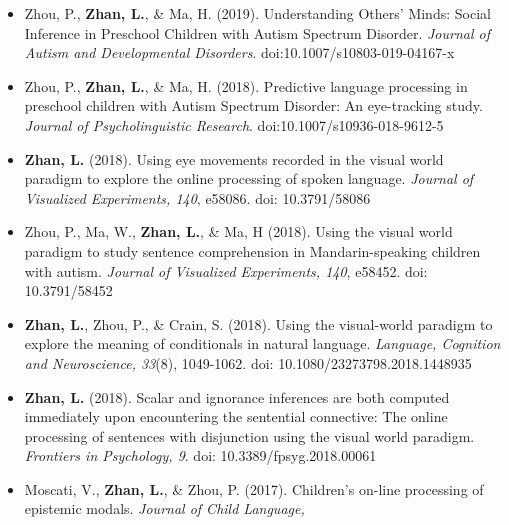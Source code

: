 \documentclass[12pt,]{article}
\begin{document}
\begin{itemize}
\item
  Zhou, P., \textbf{Zhan, L.}, \& Ma, H. (2019). Understanding Others'
  Minds: Social Inference in Preschool Children with Autism Spectrum
  Disorder. \emph{Journal of Autism and Developmental Disorders}.
  doi:10.1007/s10803-019-04167-x
  \href{https://publications.likan.info/Periodicals/JAutismDevDisord2019.pdf}{
  \faFilePdf[regular] }
\item
  Zhou, P., \textbf{Zhan, L.}, \& Ma, H. (2018). Predictive language
  processing in preschool children with Autism Spectrum Disorder: An
  eye-tracking study. \emph{Journal of Psycholinguistic Research}.
  doi:10.1007/s10936-018-9612-5
  \href{https://publications.likan.info/Periodicals/JPsycholinguistRes2018.pdf}{
  \faFilePdf[regular] }
\item
  \textbf{Zhan, L.} (2018). Using eye movements recorded in the visual
  world paradigm to explore the online processing of spoken language.
  \emph{Journal of Visualized Experiments, 140}, e58086. doi:
  10.3791/58086
  \href{https://publications.likan.info/Periodicals/jove-protocol-58086.pdf}{
  \faFilePdf[regular] }
\item
  Zhou, P., Ma, W., \textbf{Zhan, L.}, \& Ma, H (2018). Using the visual
  world paradigm to study sentence comprehension in Mandarin-speaking
  children with autism. \emph{Journal of Visualized Experiments, 140},
  e58452. doi: 10.3791/58452
  \href{https://publications.likan.info/Periodicals/jove-protocol-58452.pdf}{
  \faFilePdf[regular] }
\item
  \textbf{Zhan, L.}, Zhou, P., \& Crain, S. (2018). Using the
  visual-world paradigm to explore the meaning of conditionals in
  natural language. \emph{Language, Cognition and Neuroscience, 33}(8),
  1049-1062. doi: 10.1080/23273798.2018.1448935
  \href{https://publications.likan.info/Periodicals/LangCognNeurosci2018.pdf}{
  \faFilePdf[regular] }
\item
  \textbf{Zhan, L.} (2018). Scalar and ignorance inferences are both
  computed immediately upon encountering the sentential connective: The
  online processing of sentences with disjunction using the visual world
  paradigm. \emph{Frontiers in Psychology, 9}. doi:
  10.3389/fpsyg.2018.00061
  \href{https://www.frontiersin.org/articles/10.3389/fpsyg.2018.00061/full}{
  \faFilePdf[regular] }
\item
  Moscati, V., \textbf{Zhan, L.}, \& Zhou, P. (2017). Children's on-line
  processing of epistemic modals. \emph{Journal of Child Language,
}
\end{itemize}
\end{document}
